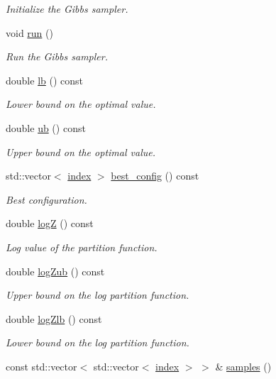 \begin{DoxyCompactItemize}
\begin{DoxyCompactList}\small\item\em Initialize the Gibbs sampler. \end{DoxyCompactList}\item 
void \hyperlink{classmerlin_1_1gibbs_a2f9555aa3830e21e15a74c2ce7dc2109}{run} ()\hypertarget{classmerlin_1_1gibbs_a2f9555aa3830e21e15a74c2ce7dc2109}{}\label{classmerlin_1_1gibbs_a2f9555aa3830e21e15a74c2ce7dc2109}

\begin{DoxyCompactList}\small\item\em Run the Gibbs sampler. \end{DoxyCompactList}\item 
double \hyperlink{classmerlin_1_1gibbs_a560e770c1d7fe247e5fcb088cd00198c}{lb} () const 
\begin{DoxyCompactList}\small\item\em Lower bound on the optimal value. \end{DoxyCompactList}\item 
double \hyperlink{classmerlin_1_1gibbs_ac433bf8d912355ed96f4d2299f8d71d9}{ub} () const 
\begin{DoxyCompactList}\small\item\em Upper bound on the optimal value. \end{DoxyCompactList}\item 
std\+::vector$<$ \hyperlink{classmerlin_1_1graph_a5cade38832f47248573e921276f122d6}{index} $>$ \hyperlink{classmerlin_1_1gibbs_a10fd6e4e76f510f10a802e97584aff9e}{best\+\_\+config} () const 
\begin{DoxyCompactList}\small\item\em Best configuration. \end{DoxyCompactList}\item 
double \hyperlink{classmerlin_1_1gibbs_a2a57b5f7fa9571060e134164ca39c68f}{logZ} () const 
\begin{DoxyCompactList}\small\item\em Log value of the partition function. \end{DoxyCompactList}\item 
double \hyperlink{classmerlin_1_1gibbs_abfd6c9073faa8827b87acf333de77cd6}{log\+Zub} () const 
\begin{DoxyCompactList}\small\item\em Upper bound on the log partition function. \end{DoxyCompactList}\item 
double \hyperlink{classmerlin_1_1gibbs_ab4ee1ac60166f1e30b14e07a534aa4b8}{log\+Zlb} () const 
\begin{DoxyCompactList}\small\item\em Lower bound on the log partition function. \end{DoxyCompactList}\item 
const std\+::vector$<$ std\+::vector$<$ \hyperlink{classmerlin_1_1graph_a5cade38832f47248573e921276f122d6}{index} $>$ $>$ \& \hyperlink{classmerlin_1_1gibbs_a2b8c1231e5f9c770ab94d8bac275014a}{samples} ()\hypertarget{classmerlin_1_1gibbs_a2b8c1231e5f9c770ab94d8bac275014a}{}\label{classmerlin_1_1gibbs_a2b8c1231e5f9c770ab94d8bac275014a}


\end{DoxyCompactItemize}
